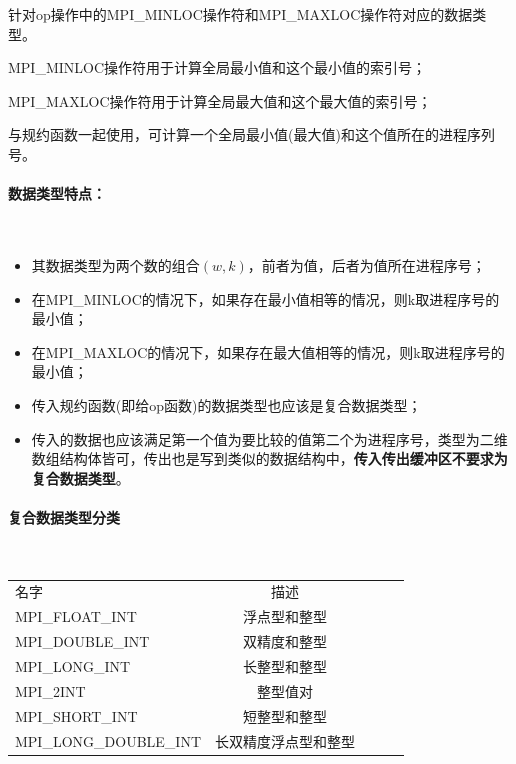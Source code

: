 \documentclass[UTF8]{article}%
\begin{document}
针对op操作中的MPI\_MINLOC操作符和MPI\_MAXLOC操作符对应的数据类型。

MPI\_MINLOC操作符用于计算全局最小值和这个最小值的索引号；

MPI\_MAXLOC操作符用于计算全局最大值和这个最大值的索引号；

与规约函数一起使用，可计算一个全局最小值(最大值)和这个值所在的进程序列号。

\paragraph{数据类型特点：}~{}

\begin{itemize}
    \item 其数据类型为两个数的组合$(w,k)$，前者为值，后者为值所在进程序号；
    \item 在MPI\_MINLOC的情况下，如果存在最小值相等的情况，则k取进程序号的最小值；
    \item 在MPI\_MAXLOC的情况下，如果存在最大值相等的情况，则k取进程序号的最小值；
    \item 传入规约函数(即给op函数)的数据类型也应该是复合数据类型；
    \item 传入的数据也应该满足第一个值为要比较的值第二个为进程序号，类型为二维数组结构体皆可，传出也是写到类似的数据结构中，\textbf{传入传出缓冲区不要求为复合数据类型}。
\end{itemize}

\paragraph{复合数据类型分类}~{}

\begin{tabular}{l c c c r}
    名字                    &     描述                    \\
    MPI\_FLOAT\_INT         &     浮点型和整型            \\
    MPI\_DOUBLE\_INT        &     双精度和整型            \\
    MPI\_LONG\_INT          &     长整型和整型            \\
    MPI\_2INT               &     整型值对                \\
    MPI\_SHORT\_INT         &     短整型和整型            \\
    MPI\_LONG\_DOUBLE\_INT  &     长双精度浮点型和整型     \\

\end{tabular}
\end{document}
